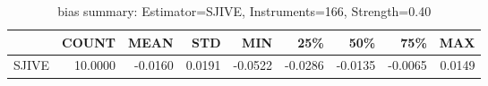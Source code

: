 \begin{table}[ht]
\centering
\caption{bias summary: Estimator=SJIVE, Instruments=166, Strength=0.40}
\begin{tabular}{lrrrrrrrr}
\toprule
 & COUNT & MEAN & STD & MIN & 25\% & 50\% & 75\% & MAX \\
\midrule
SJIVE & 10.0000 & -0.0160 & 0.0191 & -0.0522 & -0.0286 & -0.0135 & -0.0065 & 0.0149 \\
\bottomrule
\end{tabular}
\end{table}
